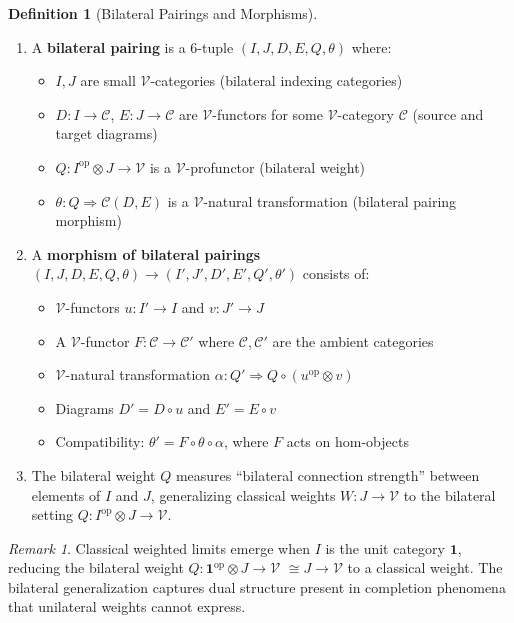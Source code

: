 \documentclass[11pt]{article}
\theoremstyle{plain}
\theoremstyle{definition}
\newtheorem{definition}[theorem]{Definition}
\theoremstyle{remark}
\newtheorem{remark}[theorem]{Remark}
\newcommand{\V}{\mathcal{V}}
\newcommand{\C}{\mathcal{C}}
\newcommand{\op}{\mathrm{op}}
\begin{document}
\begin{definition}[Bilateral Pairings and Morphisms]\label{def:bilateral-pairing}
\mbox{} \bigskip
\begin{enumerate}
\item A \textbf{bilateral pairing} is a 6-tuple $(I, J, D, E, Q, \theta)$ where:
\begin{itemize}
\item $I, J$ are small $\V$-categories (bilateral indexing categories)
\item $D : I \to \C$, $E : J \to \C$ are $\V$-functors for some $\V$-category $\C$ (source and target diagrams)
\item $Q : I^{\op} \otimes J \to \V$ is a $\V$-profunctor (bilateral weight)
\item $\theta : Q \Rightarrow \C(D, E)$ is a $\V$-natural transformation (bilateral pairing morphism)
\end{itemize}

\item A \textbf{morphism of bilateral pairings} $(I, J, D, E, Q, \theta) \to (I', J', D', E', Q', \theta')$ consists of:
\begin{itemize}
\item $\V$-functors $u : I' \to I$ and $v : J' \to J$
\item A $\V$-functor $F : \C \to \C'$ where $\C, \C'$ are the ambient categories
\item $\V$-natural transformation $\alpha : Q' \Rightarrow Q \circ (u^{\op} \otimes v)$
\item Diagrams $D' = D \circ u$ and $E' = E \circ v$
\item Compatibility: $\theta' = F \circ \theta \circ \alpha$, where $F$ acts on hom-objects
\end{itemize}

\item The bilateral weight $Q$ measures ``bilateral connection strength'' between elements of $I$ and $J$, generalizing classical weights $W : J \to \V$ to the bilateral setting $Q : I^{\op} \otimes J \to \V$.
\end{enumerate}
\end{definition}

\begin{remark}
Classical weighted limits emerge when $I$ is the unit category $\mathbf{1}$, reducing the bilateral weight $Q : \mathbf{1}^{\op} \otimes J \to \V$ $\cong J \to \V$ to a classical weight. The bilateral generalization captures dual structure present in completion phenomena that unilateral weights cannot express.
\end{remark}
\end{document}
